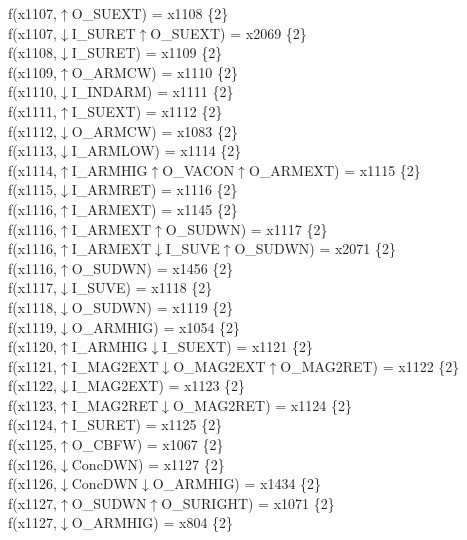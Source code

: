 f(x1107,$\uparrow$O\_SUEXT) = x1108 \{2\} \\  
f(x1107,$\downarrow$I\_SURET$\uparrow$O\_SUEXT) = x2069 \{2\} \\  
f(x1108,$\downarrow$I\_SURET) = x1109 \{2\} \\  
f(x1109,$\uparrow$O\_ARMCW) = x1110 \{2\} \\  
f(x1110,$\downarrow$I\_INDARM) = x1111 \{2\} \\  
f(x1111,$\uparrow$I\_SUEXT) = x1112 \{2\} \\  
f(x1112,$\downarrow$O\_ARMCW) = x1083 \{2\} \\  
f(x1113,$\downarrow$I\_ARMLOW) = x1114 \{2\} \\  
f(x1114,$\uparrow$I\_ARMHIG$\uparrow$O\_VACON$\uparrow$O\_ARMEXT) = x1115 \{2\} \\  
f(x1115,$\downarrow$I\_ARMRET) = x1116 \{2\} \\  
f(x1116,$\uparrow$I\_ARMEXT) = x1145 \{2\} \\  
f(x1116,$\uparrow$I\_ARMEXT$\uparrow$O\_SUDWN) = x1117 \{2\} \\  
f(x1116,$\uparrow$I\_ARMEXT$\downarrow$I\_SUVE$\uparrow$O\_SUDWN) = x2071 \{2\} \\  
f(x1116,$\uparrow$O\_SUDWN) = x1456 \{2\} \\  
f(x1117,$\downarrow$I\_SUVE) = x1118 \{2\} \\  
f(x1118,$\downarrow$O\_SUDWN) = x1119 \{2\} \\  
f(x1119,$\downarrow$O\_ARMHIG) = x1054 \{2\} \\  
f(x1120,$\uparrow$I\_ARMHIG$\downarrow$I\_SUEXT) = x1121 \{2\} \\  
f(x1121,$\uparrow$I\_MAG2EXT$\downarrow$O\_MAG2EXT$\uparrow$O\_MAG2RET) = x1122 \{2\} \\  
f(x1122,$\downarrow$I\_MAG2EXT) = x1123 \{2\} \\  
f(x1123,$\uparrow$I\_MAG2RET$\downarrow$O\_MAG2RET) = x1124 \{2\} \\  
f(x1124,$\uparrow$I\_SURET) = x1125 \{2\} \\  
f(x1125,$\uparrow$O\_CBFW) = x1067 \{2\} \\  
f(x1126,$\downarrow$ConcDWN) = x1127 \{2\} \\  
f(x1126,$\downarrow$ConcDWN$\downarrow$O\_ARMHIG) = x1434 \{2\} \\  
f(x1127,$\uparrow$O\_SUDWN$\uparrow$O\_SURIGHT) = x1071 \{2\} \\  
f(x1127,$\downarrow$O\_ARMHIG) = x804 \{2\} \\  
